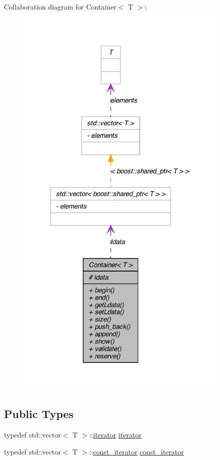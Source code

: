Collaboration diagram for Container$<$ T $>$:
\nopagebreak
\begin{figure}[H]
\begin{center}
\leavevmode
\includegraphics[width=288pt]{class_container__coll__graph}
\end{center}
\end{figure}
\subsection*{Public Types}
\begin{DoxyCompactItemize}
\item 
typedef std::vector$<$ T $>$::\hyperlink{class_container_a9baa5c3be9ea8fb85a4fd43f29ab7504}{iterator} \hyperlink{class_container_a9baa5c3be9ea8fb85a4fd43f29ab7504}{iterator}
\item 
typedef std::vector$<$ T $>$::\hyperlink{class_container_a14d2de6ebbd48b6b78e8a0d66070c305}{const\_\-iterator} \hyperlink{class_container_a14d2de6ebbd48b6b78e8a0d66070c305}{const\_\-iterator}
\end{DoxyCompactItemize}
